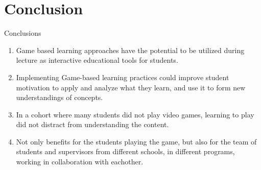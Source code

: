 \documentclass{beamer}
\begin{document}
	\section{Conclusion}
	\begin{frame}{Conclusions}
		\begin{enumerate}	
			\item Game based learning approaches have the potential to be utilized during lecture as interactive educational tools for students. \newline
			\item Implementing Game-based learning practices could improve student motivation to apply and analyze what they learn, and use it to form new understandings of concepts. \newline
			\item In a cohort where many students did not play video games, learning to play did not distract from understanding the content. \newline
			\item Not only benefits for the students playing the game, but also for the team of students and supervisors from different schools, in different programs, working in collaboration with eachother.
		\end{enumerate}
	\end{frame}
\end{document}
